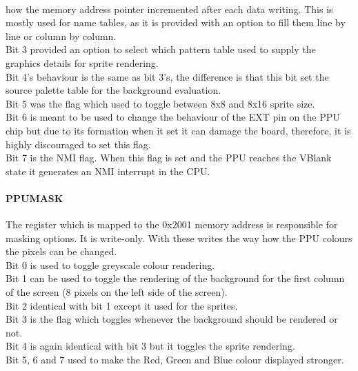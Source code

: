 \documentclass[]{report}
\begin{document}
\paragraph{ }how the memory address pointer incremented after each data writing. This is mostly used for name tables, as it is provided with an option to fill them line by line or column by column.
\\
Bit 3 provided an option to select which pattern table used to supply the graphics details for sprite rendering.
\\
Bit 4's behaviour is the same as bit 3's, the difference is that this bit set the source palette table for the background evaluation.
\\
Bit 5 was the flag which used to toggle between 8x8 and 8x16 sprite size.
\\
Bit 6 is meant to be used to change the behaviour of the EXT pin on the PPU chip but due to its formation when it set it can damage the board, therefore, it is highly discouraged to set this flag.
\\
Bit 7 is the NMI flag. When this flag is set and the PPU reaches the VBlank state it generates an NMI interrupt in the CPU.

\paragraph{PPUMASK}
The register which is mapped to the 0x2001 memory address is responsible for masking options. It is write-only. With these writes the way how the PPU colours the pixels can be changed.
\\
Bit 0 is used to toggle greyscale colour rendering.
\\
Bit 1 can be used to toggle the rendering of the background for the first column of the screen (8 pixels on the left side of the screen).
\\
Bit 2 identical with bit 1 except it used for the sprites.
\\
Bit 3 is the flag which toggles whenever the background should be rendered or not.
\\
Bit 4 is again identical with bit 3 but it toggles the sprite rendering.
\\
Bit 5, 6 and 7 used to make the Red, Green and Blue colour displayed stronger.
\end{document}
